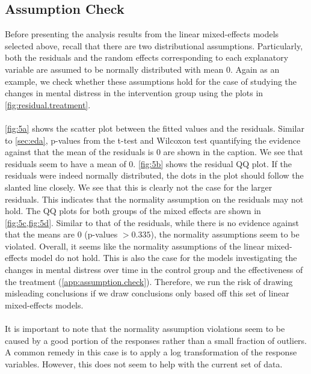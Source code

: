 \subsection{Assumption Check}
Before presenting the analysis results from the linear mixed-effects models selected above, recall that there are two distributional assumptions. Particularly, both the residuals and the random effects corresponding to each explanatory variable are assumed to be normally distributed with mean 0. Again as an example, we check whether these assumptions hold for the case of studying the changes in mental distress in the intervention group using the plots in \cref{fig:residual.treatment}.\\\\
\cref{fig:5a} shows the scatter plot between the fitted values and the residuals. Similar to \cref{sec:eda}, p-values from the t-test and Wilcoxon test quantifying the evidence against that the mean of the residuals is 0 are shown in the caption. We see that residuals seem to have a mean of 0. \cref{fig:5b} shows the residual QQ plot. If the residuals were indeed normally distributed, the dots in the plot should follow the slanted line closely. We see that this is clearly not the case for the larger residuals. This indicates that the normality assumption on the residuals may not hold. The QQ plots for both groups of the mixed effects are shown in \cref{fig:5c,fig:5d}. Similar to that of the residuals, while there is no evidence against that the means are 0 (p-values $> 0.335$), the normality assumptions seem to be violated. Overall, it seems like the normality assumptions of the linear mixed-effects model do not hold. This is also the case for the models investigating the changes in mental distress over time in the control group and the effectiveness of the treatment (\cref{app:assumption.check}). Therefore, we run the risk of drawing misleading conclusions if we draw conclusions only based off this set of linear mixed-effects models.\\\\
It is important to note that the normality assumption violations seem to be caused by a good portion of the responses rather than a small fraction of outliers. A common remedy in this case is to apply a log transformation of the response variables. However, this does not seem to help with the current set of data.
